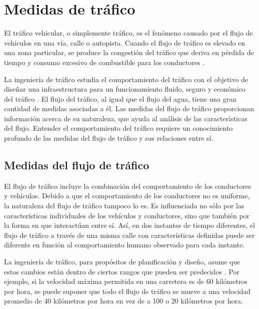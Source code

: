 \chapter{Medidas de tráfico}
\label{cap:5}

El tráfico vehicular, o simplemente tráfico, es el fenómeno causado por el flujo de vehículos en una vía, calle o autopista. Cuando el flujo de tráfico es elevado en una zona particular, se produce la congestión del tráfico que deriva en pérdida de tiempo y consumo excesivo de combustible para los conductores \cite{litman2011smart}.

La ingeniería de tráfico estudia el comportamiento del tráfico con el objetivo de diseñar una infraestructura para un funcionamiento fluido, seguro y económico del tráfico \cite{kadiyali1987traffic}. El flujo del tráfico, al igual que el flujo del agua, tiene una gran cantidad de medidas asociadas a él. Las medidas del flujo de tráfico proporcionan información acerca de su naturaleza, que ayuda al análisis de las características del flujo. Entender el comportamiento del tráfico requiere un conocimiento profundo de las medidas del flujo de tráfico y sus relaciones entre sí.

\section{Medidas del flujo de tráfico}

El flujo de tráfico incluye la combinación del comportamiento de los conductores y vehículos. Debido a que el comportamiento de los conductores no es uniforme, la naturaleza del flujo de tráfico tampoco lo es. Es influenciada no sólo por las características individuales de los vehículos y conductores, sino que también por la forma en que interactúan entre sí. Así, en dos instantes de tiempo diferentes, el flujo de tráfico a través de una misma calle con características definidas puede ser diferente en función al comportamiento humano observado para cada instante.

La ingeniería de tráfico, para propósitos de planificación y diseño, asume que estos cambios están dentro de ciertos rangos que pueden ser predecidos \cite{papacostas1987fundamentals}. Por ejemplo, si la velocidad máxima permitida en una carretera es de 60 kilómetros por hora, se puede suponer que todo el flujo de tráfico se mueve a una velocidad promedio de 40 kilómetros por hora en vez de a 100 o 20 kilómetros por hora. 

